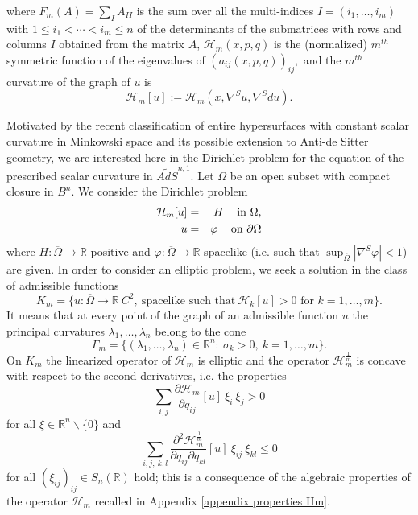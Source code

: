 \documentclass[10pt,reqno,oneside]{amsart}
\theoremstyle{definition}
\theoremstyle{remark}
\newcommand{\R}{\mathbb{R}}
\begin{document}
where $F_m(A)=\sum_I A_{II}$ is the sum over all the multi-indices $I=(i_1,\ldots,i_m)$ with $1\leq i_1<\cdots<i_m\leq n$ of the determinants of the submatrices with rows and columns $I$ obtained from the matrix $A$, $\mathcal{H}_m(x,p,q)$ is the (normalized) $m^{th}$ symmetric function of the eigenvalues of $(a_{ij}(x,p,q))_{ij},$ and the $m^{th}$ curvature of the graph of $u$ is 
\begin{equation}\label{intro Hm=H}
\mathcal{H}_m[u]:=\mathcal{H}_m(x,\nabla^S u,\nabla^Sdu).
\end{equation}

Motivated by the recent classification of entire hypersurfaces with constant scalar curvature in Minkowski space \cite{BS} and its possible extension to Anti-de Sitter geometry, we are interested here in the Dirichlet problem for the equation of the prescribed scalar curvature in $\widetilde{AdS}^{n,1}.$ Let $\Omega$ be an open subset with compact closure in $B^n.$ We consider the Dirichlet problem
\begin{eqnarray}
\mathcal{H}_m[u]&=&H\hspace{.3cm}\mbox{ in }\Omega,\label{Dirichlet problem}\\
u&=&\varphi\hspace{.3cm}\mbox{ on }\partial\Omega\nonumber
\end{eqnarray}
where $H:\overline{\Omega}\rightarrow\R$ positive and $\varphi:\overline{\Omega}\rightarrow\R$ spacelike (i.e. such that $\sup_{\overline{\Omega}}|\nabla^S\varphi|<1$) are given. In order to consider an elliptic problem, we seek a solution in the class of admissible functions
$$K_m=\{u:\overline{\Omega}\rightarrow\R\ C^2,\ \mbox{spacelike such that}\ \mathcal{H}_k[u]>0\mbox{ for }k=1,\ldots, m\}.$$
It means that at every point of the graph of an admissible function $u$ the principal curvatures $\lambda_1,\ldots,\lambda_n$ belong to the cone
$$\Gamma_m=\{(\lambda_1,\ldots,\lambda_n)\in\R^n:\ \sigma_k>0,\ k=1,\ldots,m\}.$$
On $K_m$ the linearized operator of $\mathcal{H}_m$ is elliptic and the operator $\mathcal{H}_m^{\frac{1}{m}}$ is concave with respect to the second derivatives, i.e. the properties
\begin{equation}\label{intro Hm elliptic Km}
\sum_{i,j}\frac{\partial\mathcal{H}_m}{\partial q_{ij}}[u]\ \xi_i\ \xi_j>0
\end{equation}
for all $\xi\in\R^n\backslash\{0\}$ and
\begin{equation}\label{intro Hm concave Km}
\sum_{i,j,\ k,l}\frac{\partial^2\mathcal{H}_m^{\frac{1}{m}}}{\partial q_{ij}\partial q_{kl}}[u]\ \xi_{ij}\ \xi_{kl}\leq 0
\end{equation}
for all $(\xi_{ij})_{ij}\in S_n(\R)$ hold; this is a consequence of the algebraic properties of the operator $\mathcal{H}_m$ recalled in Appendix \ref{appendix properties Hm}. 
\end{document}
